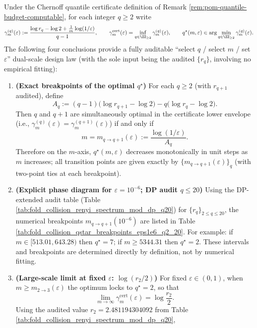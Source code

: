 \begin{remark}\label{rem:pom-qstar-phase-diagram-breakpoints}
Under the Chernoff quantile certificate definition of Remark \ref{rem:pom-quantile-budget-computable}, for each integer \(q\ge 2\) write
\[
\gamma^{(q)}_m(\varepsilon)
:=
\frac{\log r_q-\log 2+\frac{1}{m}\log(1/\varepsilon)}{q-1},
\qquad
\gamma^{\mathrm{cert}}_m(\varepsilon)=\inf_{q\in\ZZ_{\ge 2}}\gamma^{(q)}_m(\varepsilon),
\qquad
q^\star(m,\varepsilon)\in\arg\min_{q\in\ZZ_{\ge 2}}\gamma^{(q)}_m(\varepsilon).
\]
The following four conclusions provide a fully auditable ``select \(q\) / select \(m\) / set \(\varepsilon\)'' dual-scale design law (with the sole input being the audited \(\{r_q\}\), involving no empirical fitting):
\begin{enumerate}
  \item \textbf{(Exact breakpoints of the optimal \(q^\star\))}
  For each \(q\ge 2\) (with \(r_{q+1}\) audited), define
  \[
  A_q
  :=
  (q-1)\bigl(\log r_{q+1}-\log 2\bigr)-q\bigl(\log r_q-\log 2\bigr).
  \]
  Then \(q\) and \(q+1\) are simultaneously optimal in the certificate lower envelope (i.e., \(\gamma^{(q)}_m(\varepsilon)=\gamma^{(q+1)}_m(\varepsilon)\)) if and only if
  \[
  m=m_{q\to q+1}(\varepsilon):=\frac{\log(1/\varepsilon)}{A_q}.
  \]
  Therefore on the \(m\)-axis, \(q^\star(m,\varepsilon)\) decreases monotonically in unit steps as \(m\) increases; all transition points are given exactly by \(\{m_{q\to q+1}(\varepsilon)\}_q\) (with two-point ties at each breakpoint).
  \item \textbf{(Explicit phase diagram for \(\varepsilon=10^{-6}\); DP audit \(q\le 20\))}
  Using the DP-extended audit table (Table \ref{tab:fold_collision_renyi_spectrum_mod_dp_q20}) for \(\{r_q\}_{2\le q\le 20}\), the numerical breakpoints \(m_{q\to q+1}(10^{-6})\) are listed in Table \ref{tab:fold_collision_qstar_breakpoints_eps1e6_q2_20}.
  For example: if \(m\in[513.01,643.28)\) then \(q^\star=7\); if \(m\ge 5344.31\) then \(q^\star=2\). These intervals and breakpoints are determined directly by definition, not by numerical fitting.
  \item \textbf{(Large-scale limit at fixed \(\varepsilon\): \texorpdfstring{$\log(r_2/2)$}{log(r2/2)})}
  For fixed \(\varepsilon\in(0,1)\), when \(m\ge m_{2\to 3}(\varepsilon)\) the optimum locks to \(q^\star=2\), so that
  \[
  \lim_{m\to\infty}\gamma^{\mathrm{cert}}_m(\varepsilon)=\log\frac{r_2}{2}.
  \]
  Using the audited value \(r_2=2.481194304092\) from Table \ref{tab:fold_collision_renyi_spectrum_mod_dp_q20},

\end{enumerate}
\end{remark}
